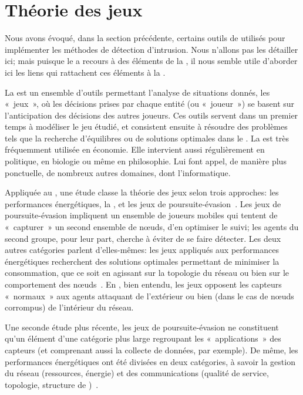 \section{Théorie des jeux}

Nous avons évoqué, dans la section précédente, certains outils de  utilisés pour implémenter les méthodes de détection d'intrusion.
Nous n'allons pas les détailler ici; mais puisque le  a recours à des éléments de la , il nous semble utile d'aborder ici les liens qui rattachent ces éléments à la \secu.

La  est un ensemble d'outils permettant l'analyse de situations donnés, les « jeux », où les décisions prises par chaque entité (ou « joueur ») se basent sur l'anticipation des décisions des autres joueurs.
Ces outils servent dans un premier temps à modéliser le jeu étudié, et consistent ensuite à résoudre des problèmes tels que la recherche d'équilibres ou de solutions optimales dans le .
La  est très fréquemment utilisée en économie.
Elle intervient aussi régulièrement en politique, en biologie ou même en philosophie.
Lui font appel, de manière plus ponctuelle, de nombreux autres domaines, dont l'informatique.

Appliquée au \rcsfs, une étude classe la théorie des jeux selon trois approches: les performances énergétiques, la \secu, et les jeux de poursuite-évasion~\cite{MT08}.
Les jeux de poursuite-évasion impliquent un ensemble de joueurs mobiles qui tentent de « capturer » un second ensemble de nœuds, d'en optimiser le suivi; les agents du second groupe, pour leur part, cherche à éviter de se faire détecter.
Les deux autres catégories parlent d'elles-mêmes: les jeux appliqués aux performances énergétiques recherchent des solutions optimales permettant de minimiser la consommation, que ce soit en agissant sur la topologie du réseau ou bien sur le comportement des nœuds~\cite{CPF09}.
En \secu, bien entendu, les jeux opposent les capteurs « normaux » aux agents attaquant de l'extérieur ou bien (dans le cas de nœuds corrompus) de l'intérieur du réseau.

Une seconde étude plus récente, les jeux de poursuite-évasion ne constituent qu'un élément d'une catégorie plus large regroupant les « applications » des capteurs (et comprenant aussi la collecte de données, par exemple).
De même, les performances énergétiques ont été divisées en deux catégories, à savoir la gestion du réseau (ressources, énergie) et des communications (qualité de service, topologie, structure de )~\cite{SWKC12}.

